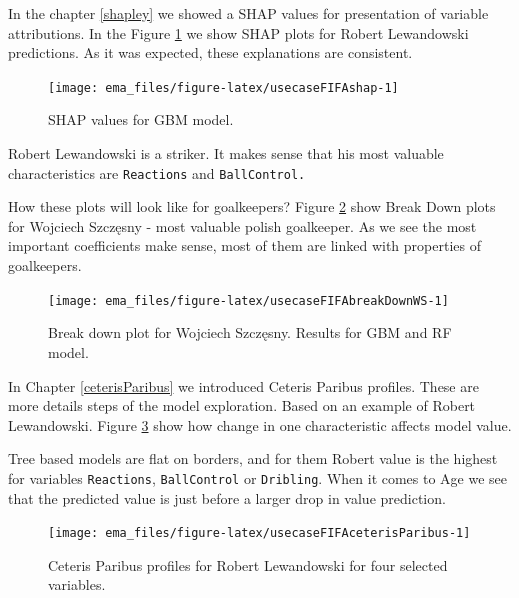 \documentclass[]{krantz}
\begin{document}
In the chapter \ref{shapley} we showed a SHAP values for presentation of variable attributions. In the Figure \ref{fig:usecaseFIFAshap} we show SHAP plots for Robert Lewandowski predictions. As it was expected, these explanations are consistent.

\begin{figure}

{\centering \texttt{[image: ema\_files/figure-latex/usecaseFIFAshap-1]} 

}

\caption{SHAP values for GBM model.}\label{fig:usecaseFIFAshap}
\end{figure}

Robert Lewandowski is a striker. It makes sense that his most valuable characteristics are \texttt{Reactions} and \texttt{BallControl.}

How these plots will look like for goalkeepers? Figure \ref{fig:usecaseFIFAbreakDownWS} show Break Down plots for Wojciech Szczęsny - most valuable polish goalkeeper. As we see the most important coefficients make sense, most of them are linked with properties of goalkeepers.

\begin{figure}

{\centering \texttt{[image: ema\_files/figure-latex/usecaseFIFAbreakDownWS-1]} 

}

\caption{Break down plot for Wojciech Szczęsny. Results for GBM and RF model.}\label{fig:usecaseFIFAbreakDownWS}
\end{figure}

In Chapter \ref{ceterisParibus} we introduced Ceteris Paribus profiles. These are more details steps of the model exploration. Based on an example of Robert Lewandowski. Figure \ref{fig:usecaseFIFAceterisParibus} show how change in one characteristic affects model value.

Tree based models are flat on borders, and for them Robert value is the highest for variables \texttt{Reactions}, \texttt{BallControl} or \texttt{Dribling}. When it comes to Age we see that the predicted value is just before a larger drop in value prediction.

\begin{figure}

{\centering \texttt{[image: ema\_files/figure-latex/usecaseFIFAceterisParibus-1]} 

}

\caption{Ceteris Paribus profiles for Robert Lewandowski for four selected variables.}\label{fig:usecaseFIFAceterisParibus}
\end{figure}
\end{document}
